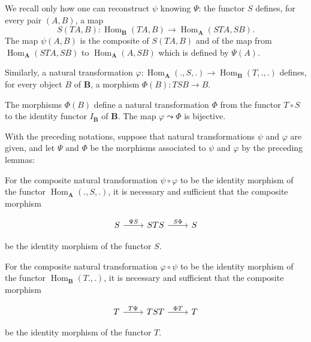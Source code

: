 We recall only how one can reconstruct $\psi$ knowing $\Psi$: the functor
$S$ defines, for every pair $(A,B)$, a map
\[
  S(TA,B)\colon
  \operatorname{Hom}_{\mathbf{B}}(TA,B)\longrightarrow
  \operatorname{Hom}_{\mathbf{A}}(STA,SB).
\]
The map $\psi(A,B)$ is the composite of $S(TA,B)$ and of the map from
$\operatorname{Hom}_{\mathbf{A}}(STA,SB)$ to
$\operatorname{Hom}_{\mathbf{A}}(A,SB)$ which is defined by $\Psi(A)$.

Similarly, a natural transformation
$\varphi\colon\operatorname{Hom}_{\mathbf{A}}(.,S,.)\to
\operatorname{Hom}_{\mathbf{B}}(T,.,.)$ defines, for every object $B$ of
$\mathbf{B}$, a morphism $\Phi(B)\colon TSB\to B$.

\begin{lemma}
The morphisms $\Phi(B)$ define a natural transformation $\Phi$ from the
functor $T\circ S$ to the identity functor $I_{\mathbf{B}}$ of
$\mathbf{B}$. The map $\varphi\leadsto\Phi$ is bijective.
\end{lemma}

With the preceding notations, suppose that natural transformations $\psi$
and $\varphi$ are given, and let $\Psi$ and $\Phi$ be the morphisms
associated to $\psi$ and $\varphi$ by the preceding lemmas:

\begin{proposition}
For the composite natural transformation $\psi\circ\varphi$ to be the
identity morphism of the functor $\operatorname{Hom}_{\mathbf{A}}(.,S,.)$,
it is necessary and sufficient that the composite morphism

\[
\begin{tikzcd}
S \arrow[r, "\Psi S"] & STS \arrow[r, "S\Phi"] & S
\end{tikzcd}
\]

be the identity morphism of the functor $S$.
\end{proposition}

\begin{proposition}
For the composite natural transformation $\varphi\circ\psi$ to be the
identity morphism of the functor $\operatorname{Hom}_{\mathbf{B}}(T.,.)$,
it is necessary and sufficient that the composite morphism

\[
\begin{tikzcd}
T \arrow[r, "T\Psi"] & TST \arrow[r, "\Phi T"] & T
\end{tikzcd}
\]

be the identity morphism of the functor $T$.
\end{proposition}

